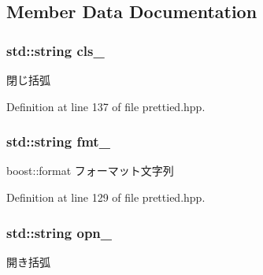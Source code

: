 \subsection{\-Member \-Data \-Documentation}
\hypertarget{structyuh_1_1range__detail_1_1range__io_ac1750e01b56a52147effe52c4e83e247}{
\subsubsection[{cls\-\_\-}]{\setlength{\rightskip}{0pt plus 5cm}std\-::string {\bf cls\-\_\-}}}\label{da/d75/structyuh_1_1range__detail_1_1range__io_ac1750e01b56a52147effe52c4e83e247}
閉じ括弧 

\-Definition at line 137 of file prettied.\-hpp.

\hypertarget{structyuh_1_1range__detail_1_1range__io_a5c63eb77f1b985d706bcb6dd96d0b0c4}{
\subsubsection[{fmt\-\_\-}]{\setlength{\rightskip}{0pt plus 5cm}std\-::string {\bf fmt\-\_\-}}}\label{da/d75/structyuh_1_1range__detail_1_1range__io_a5c63eb77f1b985d706bcb6dd96d0b0c4}
boost\-::format フォーマット文字列 

\-Definition at line 129 of file prettied.\-hpp.

\hypertarget{structyuh_1_1range__detail_1_1range__io_a551279ac03e367c8394c7e2b2c78aa3e}{
\subsubsection[{opn\-\_\-}]{\setlength{\rightskip}{0pt plus 5cm}std\-::string {\bf opn\-\_\-}}}\label{da/d75/structyuh_1_1range__detail_1_1range__io_a551279ac03e367c8394c7e2b2c78aa3e}
開き括弧 

